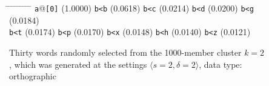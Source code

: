 \begin{figure}[ht]
\begin{mdframed}
\begin{mdframed}
\begin{small}
\begin{tabbing}
\hspace{6ex} \= \hspace{9.5ex} \= \hspace{6ex} \= \hspace{9.5ex} \= \hspace{6ex} \= \hspace{9.5ex} \= \hspace{6ex} \= \hspace{9.5ex} \= \hspace{6ex} \= \hspace{9.5ex} \kill
\texttt{a}@\texttt{[0]} \> (1.0000) \> \texttt{b<b} \> (0.0618) \> \texttt{b<c} \> (0.0214) \> \texttt{b<d} \> (0.0200) \> \texttt{b<g} \> (0.0184) \\
 \texttt{b<t} \> (0.0174) \> \texttt{b<p} \> (0.0170) \> \texttt{b<x} \> (0.0148) \> \texttt{b<h} \> (0.0140) \> \texttt{b<z} \> (0.0121)
\end{tabbing}
\end{small}
\end{mdframed}
\vspace{-6pt}
\label{fig:cluster-2-2-2-O}
\caption{Thirty words randomly selected from the 1000-member cluster $k = 2$, which was generated at the settings $\langle{s}=2,\delta=2\rangle$, data type: orthographic}
\end{mdframed}
\end{figure}

